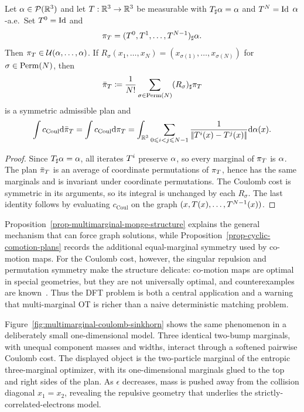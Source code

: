 \begin{prop}\label{prop-cyclic-comotion-plans}
	Let $\alpha\in\mathcal{P}(\mathbb{R}^3)$ and let $T:\mathbb{R}^3\to\mathbb{R}^3$ be measurable with $T_\sharp\alpha=\alpha$ and $T^N=\mathrm{Id}$ $\alpha$-a.e.\ Set $T^0=\mathrm{Id}$ and
	\[
		\pi_T=(T^0,T^1,\ldots,T^{N-1})_\sharp\alpha.
	\]
	Then $\pi_T\in\mathcal{U}(\alpha,\ldots,\alpha)$. If $R_\sigma(x_1,\ldots,x_N)=(x_{\sigma(1)},\ldots,x_{\sigma(N)})$ for $\sigma\in\mathrm{Perm}(N)$, then
	\[
		\bar\pi_T\coloneqq\frac1{N!}\sum_{\sigma\in\mathrm{Perm}(N)}(R_\sigma)_\sharp\pi_T
	\]
	is a symmetric admissible plan and
	\[
		\int c_{\mathrm{Coul}}\mathrm{d}\bar\pi_T
		=
		\int c_{\mathrm{Coul}}\mathrm{d}\pi_T
		=
		\int_{\mathbb{R}^3}
		\sum_{0\leqslant i<j\leqslant N-1}
		\frac{1}{|\!| T^i(x)-T^j(x) |\!|}\mathrm{d}\alpha(x).
	\]
\end{prop}
\begin{proof}
	Since $T_\sharp\alpha=\alpha$, all iterates $T^i$ preserve $\alpha$, so every marginal of $\pi_T$ is $\alpha$. The plan $\bar\pi_T$ is an average of coordinate permutations of $\pi_T$, hence has the same marginals and is invariant under coordinate permutations. The Coulomb cost is symmetric in its arguments, so its integral is unchanged by each $R_\sigma$. The last identity follows by evaluating $c_{\mathrm{Coul}}$ on the graph $(x,T(x),\ldots,T^{N-1}(x))$.
\end{proof}

Proposition~\ref{prop-multimarginal-monge-structure} explains the general mechanism that can force graph solutions, while Proposition~\ref{prop-cyclic-comotion-plans} records the additional equal-marginal symmetry used by co-motion maps. For the Coulomb cost, however, the singular repulsion and permutation symmetry make the structure delicate: co-motion maps are optimal in special geometries, but they are not universally optimal, and counterexamples are known~\cite{ColomboStraCoulombCounterexamples,BindiniDePascaleKausamoDeterministicCoulomb}. Thus the DFT problem is both a central application and a warning that multi-marginal OT is richer than a naive deterministic matching problem.

Figure~\ref{fig:multimarginal-coulomb-sinkhorn} shows the same phenomenon in a deliberately small one-dimensional model. Three identical two-bump marginals, with unequal component masses and widths, interact through a softened pairwise Coulomb cost. The displayed object is the two-particle marginal of the entropic three-marginal optimizer, with its one-dimensional marginals glued to the top and right sides of the plan. As $\epsilon$ decreases, mass is pushed away from the collision diagonal $x_1=x_2$, revealing the repulsive geometry that underlies the strictly-correlated-electrons model.

